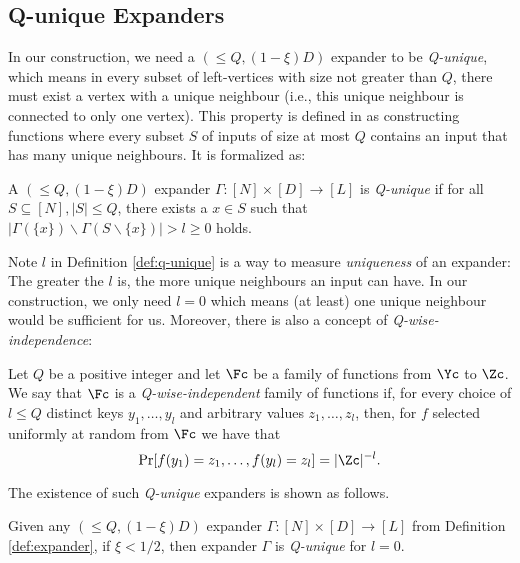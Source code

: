 \subsection{Q-unique Expanders}

In our construction, we need a $(\leq Q, (1-\xi)D)$ expander to be \textit{Q-unique}, which means in every subset of left-vertices with size not greater than $Q$, there must exist a vertex with a unique neighbour (i.e., this unique neighbour is connected to only one vertex). This property is defined in \cite{STOC:ChrPagTho15} as constructing functions where every subset $S$ of inputs of size at most $Q$ contains an input that has many unique neighbours. It is formalized as:
\begin{definition}\label{def:q-unique}	
A $(\leq Q, (1-\xi)D)$ expander $\Gamma:[N]\times[D]\to[L]$ is \textit{Q-unique} if for all $S\subseteq [N], |S|\leq Q$, there exists a $x\in S$ such that $|\Gamma(\{x\})\backslash\Gamma(S\backslash\{x\}) | > l \ge 0$ holds.
\end{definition}
Note $l$ in Definition \ref{def:q-unique} is a way to measure \textit{uniqueness} of an expander: The greater the $l$ is, the more unique neighbours an input can have. In our construction, we only need $l=0$ which means (at least) one unique neighbour would be sufficient for us. Moreover, there is also a concept of \textit{Q-wise-independence}:
\begin{definition}\label{def:Q-wise-independence}
	Let $Q$ be a positive integer and let $\Fc$ be a family of functions from $\Yc$ to $\Zc$. We say
that $\Fc$ is a \textit{Q-wise-independent} family of functions if, for every choice of $l \le Q$ distinct keys $y_1,\dots,y_l$ and arbitrary values $z_1,\dots,z_l$, then, for $f$ selected uniformly at random from $\Fc$ we have that
$$ \Pr[f(y_1)=z_1,\dots,f(y_l)=z_l]=|\Zc|^{-l}.$$
\end{definition}
%
The existence of such \textit{Q-unique} expanders is shown as follows.
\begin{theorem}\label{the:expander-xi}
	Given any $(\leq Q, (1-\xi)D)$ expander $\Gamma:[N]\times[D]\rightarrow[L]$ from Definition \ref{def:expander},
	if $\xi < 1/2$, then expander $\Gamma$ is \textit{Q-unique} for $l=0$.
\end{theorem}
